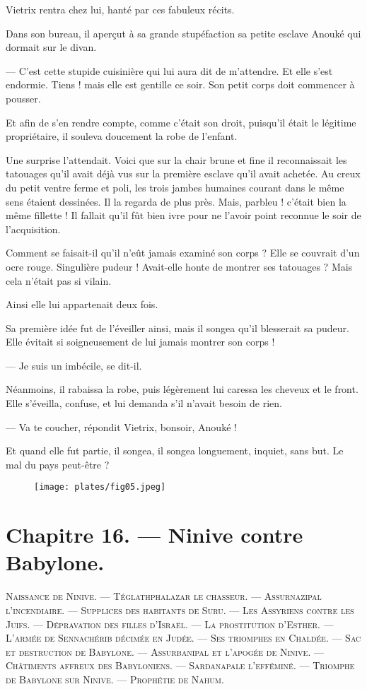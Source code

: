 \documentclass[a4paper, 11pt, oneside, polutonikogreek, french]{article}
\begin{document}
\bigskip
\centerline{\EightStarTaper}
\centerline{\EightStarTaper\EightStarTaper}
\bigskip

Vietrix rentra chez lui, hanté par ces fabuleux récits.

Dans son bureau, il aperçut à sa grande stupéfaction sa petite esclave Anouké qui dormait sur le divan.

--- C'est cette stupide cuisinière qui lui aura dit de m'attendre. Et elle s'est endormie. Tiens ! mais elle est gentille ce soir. Son petit corps doit commencer à pousser.

Et afin de s'en rendre compte, comme c'était son droit, puisqu'il était le légitime propriétaire, il souleva doucement la robe de l'enfant.

Une surprise l'attendait. Voici que sur la chair brune et fine il reconnaissait les tatouages qu'il avait déjà vus sur la première esclave qu'il avait achetée. Au creux du petit ventre ferme et poli, les trois jambes humaines courant dans le même sens étaient dessinées. Il la regarda de plus près. Mais, parbleu ! c'était bien la même fillette ! Il fallait qu'il fût bien ivre pour ne l'avoir point reconnue le soir de l'acquisition.

Comment se faisait-il qu'il n'eût jamais examiné son corps ? Elle se couvrait d'un ocre rouge. Singulière pudeur ! Avait-elle honte de montrer ses tatouages ? Mais cela n'était pas si vilain.

Ainsi elle lui appartenait deux fois.

Sa première idée fut de l'éveiller ainsi, mais il songea qu'il blesserait sa pudeur. Elle évitait si soigneusement de lui jamais montrer son corps !

--- Je suis un imbécile, se dit-il.

Néanmoins, il rabaissa la robe, puis légèrement lui caressa les cheveux et le front. Elle s'éveilla, confuse, et lui demanda s'il n'avait besoin de rien.

--- Va te coucher, répondit Vietrix, bonsoir, Anouké !

Et quand elle fut partie, il songea, il songea longuement, inquiet, sans but. Le mal du pays peut-être ?
\clearpage
\begin{figure}[H]
\centering
\texttt{[image: plates/fig05.jpeg]}
\end{figure}
\section{Chapitre 16. --- Ninive contre Babylone.}
\begin{center}
\scshape
\small
Naissance de Ninive. --- Téglathphalazar le chasseur. --- Assurnazipal l'incendiaire. --- Supplices des habitants de Suru. --- Les Assyriens contre les Juifs. --- Dépravation des filles d'Israël. --- La prostitution d'Esther. --- L'armée de Sennachérib décimée en Judée. --- Ses triomphes en Chaldée. --- Sac et destruction de Babylone. --- Assurbanipal et l'apogée de Ninive. --- Châtiments affreux des Babyloniens. --- Sardanapale l'efféminé. --- Triomphe de Babylone sur Ninive. --- Prophétie de Nahum.
\end{center}
\end{document}
